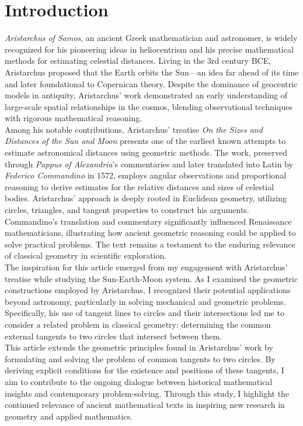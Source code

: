 \section*{Introduction}
\textit{Aristarchus of Samos}, an ancient Greek mathematician and
astronomer, is widely recognized for his pioneering ideas in
heliocentrism and his precise mathematical methods for estimating
celestial distances. Living in the 3rd century BCE, Aristarchus
proposed that the Earth orbits the Sun—an idea far ahead of its time
and later foundational to Copernican theory. Despite the dominance of
geocentric models in antiquity, Aristarchus’ work demonstrated an
early understanding of large-scale spatial relationships in the
cosmos, blending observational techniques with rigorous mathematical
reasoning.\\

Among his notable contributions, Aristarchus’ treatise \textit{On the
Sizes and Distances of the Sun and Moon}\cite{Aristarchus1572}
presents one of the earliest known attempts to estimate astronomical
distances using geometric methods. The work, preserved through
\textit{Pappus of Alexandria}’s commentaries and later translated
into Latin by \textit{Federico Commandino} in 1572, employs angular
observations and proportional reasoning to derive estimates for the
relative distances and sizes of celestial bodies. Aristarchus’
approach is deeply rooted in Euclidean geometry, utilizing circles,
triangles, and tangent properties to construct his arguments.\\

Commandino’s translation and commentary significantly influenced
Renaissance mathematicians, illustrating how ancient geometric
reasoning could be applied to solve practical problems. The text
remains a testament to the enduring relevance of classical geometry
in scientific exploration.\\

The inspiration for this article emerged from my engagement with
Aristarchus’ treatise while studying the Sun-Earth-Moon system. As I
examined the geometric constructions employed by Aristarchus, I
recognized their potential applications beyond astronomy,
particularly in solving mechanical and geometric problems.
Specifically, his use of tangent lines to circles and their
intersections led me to consider a related problem in classical
geometry: determining the common external tangents to two circles
that intersect between them.\\

This article extends the geometric principles found in Aristarchus’
work by formulating and solving the problem of common tangents to two
circles. By deriving explicit conditions for the existence and
positions of these tangents, I aim to contribute to the ongoing
dialogue between historical mathematical insights and contemporary
problem-solving. Through this study, I highlight the continued
relevance of ancient mathematical texts in inspiring new research in
geometry and applied mathematics.
